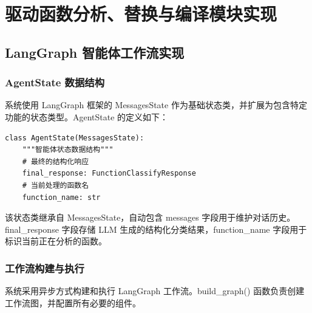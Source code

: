 

\section{驱动函数分析、替换与编译模块实现}
\label{sec:builder_impl}

\subsection{LangGraph 智能体工作流实现}

\subsubsection{AgentState 数据结构}

系统使用 LangGraph 框架的 MessagesState 作为基础状态类，并扩展为包含特定功能的状态类型。AgentState 的定义如下：

\begin{lstlisting}[style=Python,abovecaptionskip=0pt,belowcaptionskip=0pt]
class AgentState(MessagesState):
    """智能体状态数据结构"""
    # 最终的结构化响应
    final_response: FunctionClassifyResponse
    # 当前处理的函数名
    function_name: str
\end{lstlisting}

该状态类继承自 MessagesState，自动包含 messages 字段用于维护对话历史。final\_response 字段存储 LLM 生成的结构化分类结果，function\_name 字段用于标识当前正在分析的函数。

\subsubsection{工作流构建与执行}

系统采用异步方式构建和执行 LangGraph 工作流。build\_graph() 函数负责创建工作流图，并配置所有必要的组件。

